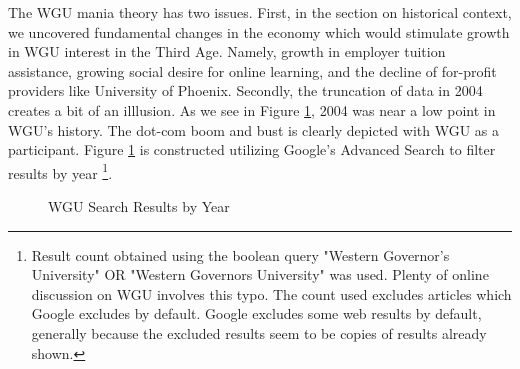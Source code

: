 \documentclass[review]{elsarticle}
\begin{document}
The WGU mania theory has two issues.
First, in the section on historical context, we uncovered fundamental changes in the economy which would stimulate growth in WGU interest in the Third Age.
Namely, growth in employer tuition assistance, growing social desire for online learning,
and the decline of for-profit providers like University of Phoenix.
Secondly, the truncation of data in 2004 creates a bit of an illlusion.
As we see in Figure \ref{fig:wgu_search_results}, 2004 was near a low point in WGU's history.
The dot-com boom and bust is clearly depicted with WGU as a participant.
Figure \ref{fig:wgu_search_results} is constructed utilizing Google's Advanced Search to filter results by year
\footnote{
    Result count obtained using the boolean query "Western Governor's University" OR "Western Governors University" was used.
    Plenty of online discussion on WGU involves this typo.
    The count used excludes articles which Google excludes by default.
    Google excludes some web results by default, generally because the excluded results seem to be copies of results already shown.
}.

\begin{figure}[h!]
    \centering
    \caption{WGU Search Results by Year}


    \label{fig:wgu_search_results}
\end{figure}
\end{document}
